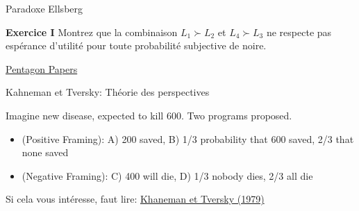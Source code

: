 \documentclass[handout]{beamer}
\begin{document}
\begin{frame}{Paradoxe Ellsberg}

\textbf{Exercice I} Montrez que la combinaison $L_1 \succ L_2$ et $L_4 \succ L_3$ ne respecte pas espérance d'utilité pour toute probabilité subjective de noire. 

\href{https://fr.wikipedia.org/wiki/Daniel_Ellsberg}{Pentagon Papers}

\end{frame}

\begin{frame}{Kahneman et Tversky: Théorie des perspectives}

Imagine new disease, expected to kill 600. Two programs proposed. 

\begin{itemize}
\item (Positive Framing): A) 200 saved, B) 1/3 probability that 600 saved, 2/3 that none saved
\item (Negative Framing): C) 400 will die, D) 1/3 nobody dies, 2/3 all die
	\end{itemize}


Si cela vous intéresse, faut lire: \href{https://www.uzh.ch/cmsssl/suz/dam/jcr:00000000-64a0-5b1c-0000-00003b7ec704/10.05-kahneman-tversky-79.pdf}{Khaneman et Tversky (1979)}

\end{frame}
\end{document}
